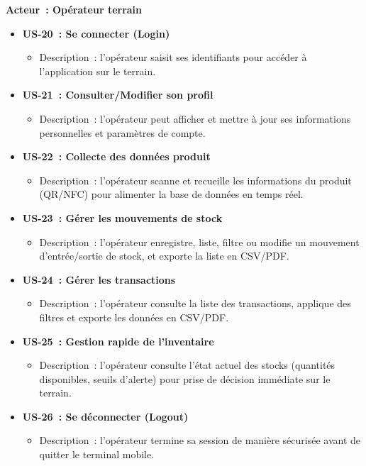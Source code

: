 \documentclass[12pt,a4paper]{report}
\begin{document}
\medskip
\noindent\textbf{Acteur : Opérateur terrain}
\begin{itemize}
  \item \textbf{US-20 : Se connecter (Login)}  
    \begin{itemize}
      \item Description : l’opérateur saisit ses identifiants pour accéder à l’application sur le terrain.
    \end{itemize}
  \item \textbf{US-21 : Consulter/Modifier son profil}  
    \begin{itemize}
      \item Description : l’opérateur peut afficher et mettre à jour ses informations personnelles et paramètres de compte.
    \end{itemize}
  \item \textbf{US-22 : Collecte des données produit}  
    \begin{itemize}
      \item Description : l’opérateur scanne et recueille les informations du produit (QR/NFC) pour alimenter la base de données en temps réel.
    \end{itemize}
  \item \textbf{US-23 : Gérer les mouvements de stock}  
    \begin{itemize}
      \item Description : l’opérateur enregistre, liste, filtre ou modifie un mouvement d’entrée/sortie de stock, et exporte la liste en CSV/PDF.
    \end{itemize}
  \item \textbf{US-24 : Gérer les transactions}  
    \begin{itemize}
      \item Description : l’opérateur consulte la liste des transactions, applique des filtres et exporte les données en CSV/PDF.
    \end{itemize}
  \item \textbf{US-25 : Gestion rapide de l’inventaire}  
    \begin{itemize}
      \item Description : l’opérateur consulte l’état actuel des stocks (quantités disponibles, seuils d’alerte) pour prise de décision immédiate sur le terrain.
    \end{itemize}
  \item \textbf{US-26 : Se déconnecter (Logout)}  
    \begin{itemize}
      \item Description : l’opérateur termine sa session de manière sécurisée avant de quitter le terminal mobile.
    \end{itemize}
\end{itemize}
\end{document}
